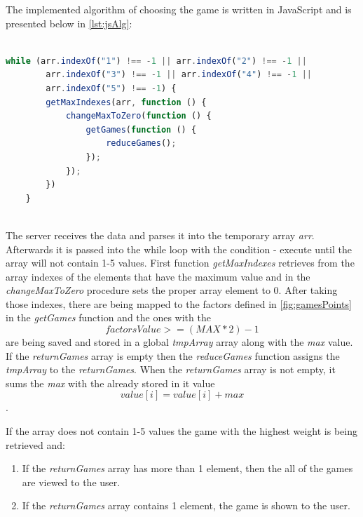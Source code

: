 The implemented algorithm of choosing the game is written in JavaScript and is presented below in \autoref{lst:jsAlg}:

\begin{lstlisting}[float=ht,escapechar=@,
    language=JavaScript,
    caption={The algorithm of choosing the game in JavaScript},
    label={lst:jsAlg},
    basicstyle=\ttfamily,
    keywordstyle=\color{blue}\ttfamily,
    stringstyle=\color{red}\ttfamily,
    captionpos=b,
    aboveskip=20pt,
    frame=trbl]

while (arr.indexOf("1") !== -1 || arr.indexOf("2") !== -1 ||
        arr.indexOf("3") !== -1 || arr.indexOf("4") !== -1 || 
        arr.indexOf("5") !== -1) {
        getMaxIndexes(arr, function () {
            changeMaxToZero(function () {
                getGames(function () {
                    reduceGames();
                });
            });
        })
    }
    
\end{lstlisting}

The server receives the data and parses it into the temporary array \textit{arr}. Afterwards it is passed into the while loop with the condition - execute until the array will not contain 1-5 values. First function \textit{getMaxIndexes} retrieves from the array indexes of the elements that have the maximum value and in the \textit{changeMaxToZero} procedure sets the proper array element to 0. After taking those indexes, there are being mapped to the factors defined in \autoref{fig:gamesPoints} in the \textit{getGames} function and the ones with the 
\[factorsValue >= (MAX * 2) - 1\]
are being saved and stored in a global \textit{tmpArray} array along with the \textit{max} value. If the \textit{returnGames} array is empty then the \textit{reduceGames} function assigns the \textit{tmpArray} to the \textit{returnGames}. When the \textit{returnGames} array is not empty, it sums the \textit{max} with the already stored in it value
\[value[i] = value[i] + max  \].

If the array does not contain 1-5 values the game with the highest weight is being retrieved and:
\begin{enumerate}
    \item If the \textit{returnGames} array has more than 1 element, then the all of the games are viewed to the user.
    \item If the \textit{returnGames} array contains 1 element, the game is shown to the user.
\end{enumerate}

